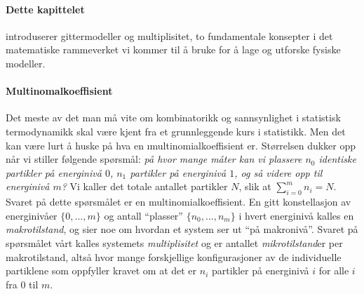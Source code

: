 
\paragraph{Dette kapittelet} introduserer gittermodeller og multiplisitet, to fundamentale konsepter i det matematiske rammeverket vi kommer til å bruke for å lage og utforske fysiske modeller.

\paragraph{Multinomalkoeffisient} Det meste av det man må vite om kombinatorikk og sannsynlighet i statistisk termodynamikk skal være kjent fra et grunnleggende kurs i statistikk. Men det kan være lurt å huske på hva en \i{multinomialkoeffisient} er. Størrelsen dukker opp når vi stiller følgende spørsmål: \emph{på hvor mange måter kan vi plassere $n_0$ identiske partikler på energinivå $0$, $n_1$ partikler på energinivå $1$, og så videre opp til energinivå $m$?} Vi kaller det totale antallet partikler $N$, slik at $\sum_{i=0}^m n_i = N$. Svaret på dette spørsmålet er en multinomialkoeffisient.
En gitt konstellasjon av energinivåer $\{0,...,m\}$ og antall ``plasser'' $\{n_0,...,n_m\}$ i hvert energinivå kalles en \emph{makrotilstand}, og sier noe om hvordan et system ser ut ``på makronivå''. Svaret på spørsmålet vårt kalles systemets \emph{multiplisitet} og er antallet \emph{mikrotilstand}er per makrotilstand, altså hvor mange forskjellige konfigurasjoner av de individuelle partiklene som oppfyller kravet om at det er $n_i$ partikler på energinivå $i$ for alle $i$ fra $0$ til $m$. 

